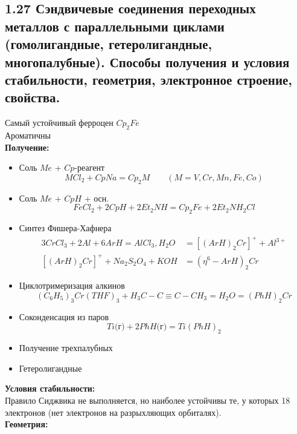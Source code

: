 
\subsection{1.27 Сэндвичевые соединения переходных металлов с параллельными циклами (гомолигандные, гетеролигандные, многопалубные). Способы получения и условия стабильности, геометрия, электронное строение, свойства.}
\begin{figure} [H]
	\centering {\texttt{[image: xx1]}}
\end{figure}
Самый устойчивый ферроцен $Cp_2Fe$ \\
Ароматичны \\
\textbf{Получение:}\\
\begin{itemize}
	\item Соль $Me$ + $Cp$-реагент
	\[
	MCl_2 + CpNa = Cp_2M \qquad (M = V, Cr, Mn, Fe, Co)
	\]
	\item Соль $Me$ + $CpH$ + осн.
	\[
	FeCl_2 + 2CpH + 2Et_2NH = Cp_2Fe + 2Et_2NH_2Cl
	\]
	\item Синтез Фишера-Хафнера
	\begin{align*}
	3CrCl_3 + 2Al + 6ArH = AlCl_3, H_2O &= \left[(ArH)_2 Cr \right]^{+} + Al^{3+} \\
	\left[(ArH)_2 Cr \right]^{+} + Na_2S_2O_4 + KOH &= (\eta^6 - ArH)_2Cr 
	\end{align*}
	\item Циклотримеризация алкинов
	\[
	(C_6H_5)_3Cr(THF)_3 + H_3C-C\equiv C-CH_3 = H_2O = (PhH)_2Cr
	\]
	\item Соконденсация из паров
	\[
	Ti\text{(г)} + 2PhH \text{(г)} = Ti(PhH)_2
	\]
	\item Получение трехпалубных 
	\begin{figure} [H]
		\centering {\texttt{[image: xx2]}}
	\end{figure}
	\item Гетеролигандные
	\begin{figure} [H]
		\centering {\texttt{[image: xx3]}}
	\end{figure}
\end{itemize}
\textbf{Условия стабильности:}\\
Правило Сиджвика не выполняется, но наиболее устойчивы те, у которых 18 электронов (нет электронов на разрыхляющих орбиталях). \\
\textbf{Геометрия:}\\
\begin{figure} [H]
	\centering {\texttt{[image: xx4]}}
\end{figure}
